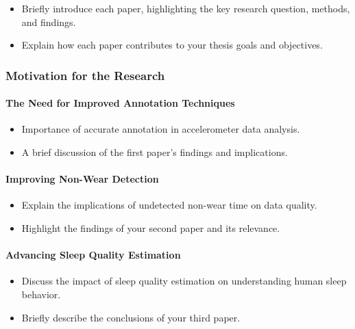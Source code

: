 \documentclass[
  9pt,
]{article}
\let\oldparagraph\paragraph
\renewcommand{\paragraph}[1]{\oldparagraph{#1}\mbox{}}
\providecommand{\tightlist}{%
  \setlength{\itemsep}{0pt}\setlength{\parskip}{0pt}}\usepackage{longtable,booktabs,array}
\begin{document}
\begin{itemize}
\item
  Briefly introduce each paper, highlighting the key research question,
  methods, and findings.
\item
  Explain how each paper contributes to your thesis goals and
  objectives.
\end{itemize}

\hypertarget{motivation-for-the-research}{%
\subsubsection{Motivation for the
Research}\label{motivation-for-the-research}}

\hypertarget{the-need-for-improved-annotation-techniques}{%
\paragraph{The Need for Improved Annotation
Techniques}\label{the-need-for-improved-annotation-techniques}}

\begin{itemize}
\tightlist
\item
  Importance of accurate annotation in accelerometer data analysis.
\item
  A brief discussion of the first paper's findings and implications.
\end{itemize}

\hypertarget{improving-non-wear-detection}{%
\paragraph{Improving Non-Wear
Detection}\label{improving-non-wear-detection}}

\begin{itemize}
\tightlist
\item
  Explain the implications of undetected non-wear time on data quality.
\item
  Highlight the findings of your second paper and its relevance.
\end{itemize}

\hypertarget{advancing-sleep-quality-estimation}{%
\paragraph{Advancing Sleep Quality
Estimation}\label{advancing-sleep-quality-estimation}}

\begin{itemize}
\tightlist
\item
  Discuss the impact of sleep quality estimation on understanding human
  sleep behavior.
\item
  Briefly describe the conclusions of your third paper.
\end{itemize}
\end{document}
